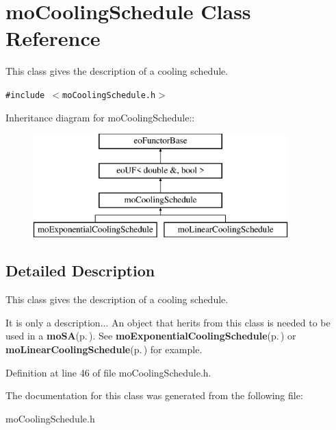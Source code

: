 \section{mo\-Cooling\-Schedule Class Reference}
\label{classmo_cooling_schedule}
This class gives the description of a cooling schedule.  


{\tt \#include $<$mo\-Cooling\-Schedule.h$>$}

Inheritance diagram for mo\-Cooling\-Schedule::\begin{figure}[H]
\begin{center}
\leavevmode
\includegraphics[height=4cm]{classmo_cooling_schedule}
\end{center}
\end{figure}


\subsection{Detailed Description}
This class gives the description of a cooling schedule. 

It is only a description... An object that herits from this class is needed to be used in a {\bf mo\-SA}{\rm (p.\,\pageref{classmo_s_a})}. See {\bf mo\-Exponential\-Cooling\-Schedule}{\rm (p.\,\pageref{classmo_exponential_cooling_schedule})} or {\bf mo\-Linear\-Cooling\-Schedule}{\rm (p.\,\pageref{classmo_linear_cooling_schedule})} for example. 



Definition at line 46 of file mo\-Cooling\-Schedule.h.

The documentation for this class was generated from the following file:\begin{CompactItemize}
\item 
mo\-Cooling\-Schedule.h\end{CompactItemize}
